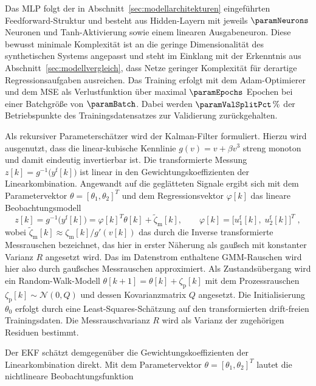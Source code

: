 %
Das \ac{MLP} folgt der in Abschnitt~\ref{sec:modellarchitekturen} eingeführten Feedforward-Struktur und besteht aus \paramNLayers Hidden-Layern mit jeweils $\paramNeurons$ Neuronen und Tanh-Aktivierung sowie einem linearen Ausgabeneuron. Diese bewusst minimale Komplexität ist an die geringe Dimensionalität des synthetischen Systems angepasst und steht im Einklang mit der Erkenntnis aus Abschnitt~\ref{sec:modellvergleich}, dass Netze geringer Komplexität für derartige Regressionsaufgaben ausreichen.
Das Training erfolgt mit dem Adam-Optimierer und dem \ac{MSE} als Verlustfunktion über maximal $\paramEpochs$ Epochen bei einer Batchgröße von $\paramBatch$. Dabei werden $\paramValSplitPct\,\%$ der Betriebspunkte des Trainingsdatensatzes zur Validierung zurückgehalten. \par
%
Als rekursiver Parameterschätzer wird der Kalman-Filter formuliert. 
Hierzu wird ausgenutzt, dass die linear-kubische Kennlinie $g(v) = v + \beta v^3$
streng monoton und damit eindeutig invertierbar ist. Die transformierte Messung
$z[k] = g^{-1}\bigl(y^{\mathrm{f}}[k]\bigr)$ ist linear in den
Gewichtungskoeffizienten der Linearkombination.
Angewandt auf die geglätteten Signale ergibt sich mit dem Parametervektor $\theta = [\theta_1, \theta_2]^T$ und dem Regressionsvektor $\varphi[k]$ das lineare Beobachtungsmodell
%
\begin{equation}
    z[k] = g^{-1}\bigl(y^{\mathrm{f}}[k]\bigr)
         = \varphi[k]^T \theta[k] + \tilde{\zeta}_{\mathrm{m}}[k],
    \qquad \varphi[k] = \bigl[u_1^{\mathrm{f}}[k],\; u_2^{\mathrm{f}}[k]\bigr]^T \; ,
    \label{eq:kf_beobachtung}
\end{equation}
%
wobei $\tilde{\zeta}_{\mathrm{m}}[k] \approx \zeta_{\mathrm{m}}[k] / g'(v[k])$
das durch die Inverse transformierte Messrauschen bezeichnet, das hier in
erster Näherung als gaußsch mit konstanter Varianz $R$ angesetzt wird. Das im Datenstrom enthaltene \ac{GMM}-Rauschen wird hier also durch gaußsches Messrauschen approximiert. Als Zustandsübergang wird ein Random-Walk-Modell $\theta[k+1] = \theta[k] + \zeta_{\mathrm{p}}[k]$ mit dem Prozessrauschen $\zeta_{\mathrm{p}}[k] \sim \mathcal{N}(0, Q)$ und dessen Kovarianzmatrix $Q$ angesetzt. Die Initialisierung $\theta_0$ erfolgt durch eine Least-Squares-Schätzung auf den transformierten drift-freien Trainingsdaten. Die Messrauschvarianz $R$ wird als Varianz der zugehörigen Residuen bestimmt. \par
%
Der \ac{EKF} schätzt demgegenüber die Gewichtungskoeffizienten der Linearkombination direkt. Mit dem Parametervektor $\theta = [\theta_1, \theta_2]^T$ lautet die nichtlineare Beobachtungsfunktion
